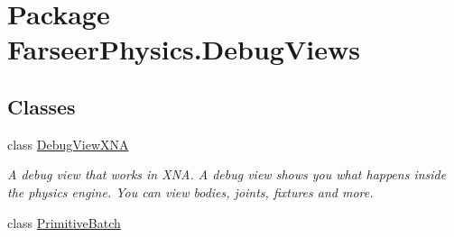 \hypertarget{namespace_farseer_physics_1_1_debug_views}{\section{Package Farseer\+Physics.\+Debug\+Views}
\label{namespace_farseer_physics_1_1_debug_views}
}
\subsection*{Classes}
\begin{DoxyCompactItemize}
\item 
class \hyperlink{class_farseer_physics_1_1_debug_views_1_1_debug_view_x_n_a}{Debug\+View\+X\+N\+A}
\begin{DoxyCompactList}\small\item\em A debug view that works in X\+N\+A. A debug view shows you what happens inside the physics engine. You can view bodies, joints, fixtures and more. \end{DoxyCompactList}\item 
class \hyperlink{class_farseer_physics_1_1_debug_views_1_1_primitive_batch}{Primitive\+Batch}
\end{DoxyCompactItemize}
